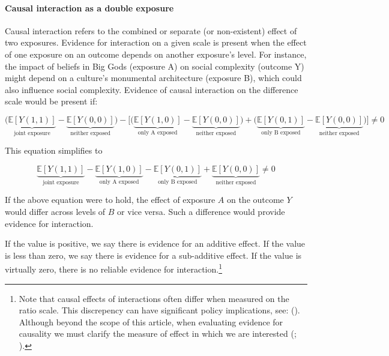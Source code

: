 \documentclass[
  singlecolumn]{article}
\let\oldparagraph\paragraph
\renewcommand{\paragraph}[1]{\oldparagraph{#1}\mbox{}}
\begin{document}
\paragraph{\texorpdfstring{\textbf{Causal interaction as a double
exposure}}{Causal interaction as a double exposure}}\label{causal-interaction-as-a-double-exposure}

Causal interaction refers to the combined or separate (or non-existent)
effect of two exposures. Evidence for interaction on a given scale is
present when the effect of one exposure on an outcome depends on another
exposure's level. For instance, the impact of beliefs in Big Gods
(exposure A) on social complexity (outcome Y) might depend on a
culture's monumental architecture (exposure B), which could also
influence social complexity. Evidence of causal interaction on the
difference scale would be present if:

\[\bigg(\underbrace{\mathbb{E}[Y(1,1)]}_{\text{joint exposure}} - \underbrace{\mathbb{E}[Y(0,0)]}_{\text{neither exposed}}\bigg) - \bigg[ \bigg(\underbrace{\mathbb{E}[Y(1,0)]}_{\text{only A exposed}} - \underbrace{\mathbb{E}[Y(0,0)]}_{\text{neither exposed}}\bigg) + \bigg(\underbrace{\mathbb{E}[Y(0,1)]}_{\text{only B exposed}} - \underbrace{\mathbb{E}[Y(0,0)]}_{\text{neither exposed}} \bigg)\bigg] \neq 0 \]

This equation simplifies to

\[ \underbrace{\mathbb{E}[Y(1,1)]}_{\text{joint exposure}} - \underbrace{\mathbb{E}[Y(1,0)]}_{\text{only A exposed}} - \underbrace{\mathbb{E}[Y(0,1)]}_{\text{only B exposed}} + \underbrace{\mathbb{E}[Y(0,0)]}_{\text{neither exposed}} \neq 0 \]

If the above equation were to hold, the effect of exposure \(A\) on the
outcome \(Y\) would differ across levels of \(B\) or vice versa. Such a
difference would provide evidence for interaction.

If the value is positive, we say there is evidence for an additive
effect. If the value is less than zero, we say there is evidence for a
sub-additive effect. If the value is virtually zero, there is no
reliable evidence for interaction.\footnote{Note that causal effects of
  interactions often differ when measured on the ratio scale. This
  discrepency can have significant policy implications, see:
  (). Although
  beyond the scope of this article, when evaluating evidence for
  causality we must clarify the measure of effect in which we are
  interested (;
  ).}
\end{document}

